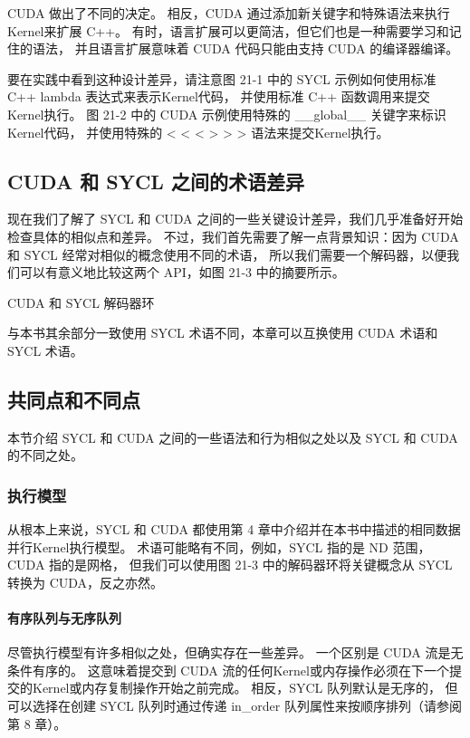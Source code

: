 CUDA 做出了不同的决定。 相反，CUDA 通过添加新关键字和特殊语法来执行Kernel来扩展 C++。 
有时，语言扩展可以更简洁，但它们也是一种需要学习和记住的语法，
并且语言扩展意味着 CUDA 代码只能由支持 CUDA 的编译器编译。

要在实践中看到这种设计差异，请注意图 21-1 中的 SYCL 示例如何使用标准 C++ lambda 表达式来表示Kernel代码，
并使用标准 C++ 函数调用来提交Kernel执行。 
图 21-2 中的 CUDA 示例使用特殊的 \_\_global\_\_ 关键字来标识Kernel代码，
并使用特殊的 < < < > > > 语法来提交Kernel执行。

\subsection{CUDA 和 SYCL 之间的术语差异}
现在我们了解了 SYCL 和 CUDA 之间的一些关键设计差异，我们几乎准备好开始检查具体的相似点和差异。 
不过，我们首先需要了解一点背景知识：因为 CUDA 和 SYCL 经常对相似的概念使用不同的术语，
所以我们需要一个解码器，以便我们可以有意义地比较这两个 API，如图 21-3 中的摘要所示。

{\color{red} CUDA 和 SYCL 解码器环}

与本书其余部分一致使用 SYCL 术语不同，本章可以互换使用 CUDA 术语和 SYCL 术语。

\subsection{共同点和不同点}
本节介绍 SYCL 和 CUDA 之间的一些语法和行为相似之处以及 SYCL 和 CUDA 的不同之处。

\subsubsection{执行模型}
从根本上来说，SYCL 和 CUDA 都使用第 4 章中介绍并在本书中描述的相同数据并行Kernel执行模型。 
术语可能略有不同，例如，SYCL 指的是 ND 范围，CUDA 指的是网格，
但我们可以使用图 21-3 中的解码器环将关键概念从 SYCL 转换为 CUDA，反之亦然。

\paragraph{有序队列与无序队列}

尽管执行模型有许多相似之处，但确实存在一些差异。 一个区别是 CUDA 流是无条件有序的。 
这意味着提交到 CUDA 流的任何Kernel或内存操作必须在下一个提交的Kernel或内存复制操作开始之前完成。 
相反，SYCL 队列默认是无序的，
但可以选择在创建 SYCL 队列时通过传递 in\_order 队列属性来按顺序排列（请参阅第 8 章）。

